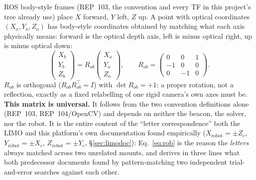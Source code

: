 ROS body-style frames (REP~103, the convention  and every TF
in this project's tree already use) place $X$ forward, $Y$ left, $Z$ up. A
point with optical coordinates $(X_o,Y_o,Z_o)$ has body-style coordinates
obtained by matching what each axis physically means: forward is the optical
depth axis, left is minus optical right, up is minus optical down:
\begin{equation}
\begin{pmatrix}X_b\\Y_b\\Z_b\end{pmatrix}
= R_{ob}\begin{pmatrix}X_o\\Y_o\\Z_o\end{pmatrix}, \qquad
R_{ob} = \begin{pmatrix} 0&0&1\\ -1&0&0\\ 0&-1&0 \end{pmatrix}.
\label{eq:rob}
\end{equation}
$R_{ob}$ is orthogonal ($R_{ob}R_{ob}^\top=I$) with $\det R_{ob}=+1$: a proper
rotation, not a reflection, exactly as a fixed relabelling of one rigid
camera's own axes must be. \textbf{This matrix is universal.} It follows from
the two convention definitions alone (REP~103, REP~104/OpenCV) and depends on
neither the beacon, the solver, nor the robot. It is the entire content of
the ``letter correspondence'' both the LIMO and this platform's own
documentation found empirically ($X_{\text{robot}}=\pm Z_c$,
$Y_{\text{robot}}=\pm X_c$, $Z_{\text{robot}}=\pm Y_c$, \S\ref{sec:limodoc}):
Eq.~\ref{eq:rob} is the reason the \emph{letters} always matched across two
unrelated mounts, and derives in three lines what both predecessor documents
found by pattern-matching two independent trial-and-error searches against
each other.

